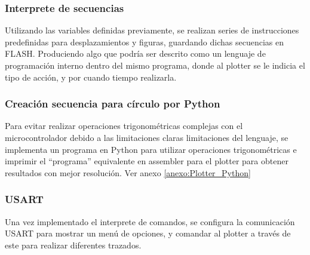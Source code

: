 \subsubsection{Interprete de secuencias}
Utilizando las variables definidas previamente, se realizan series de instrucciones predefinidas para desplazamientos y figuras, guardando dichas secuencias en FLASH. Produciendo algo que podría ser descrito como un lenguaje de programación interno dentro del mismo programa, donde al plotter se le indicia el tipo de acción, y por cuando tiempo realizarla. 

\subsubsection{Creación secuencia para círculo por Python}
Para evitar realizar operaciones trigonométricas complejas con el microcontrolador debido a las limitaciones claras limitaciones del lenguaje, se implementa un programa en Python para utilizar operaciones trigonométricas e imprimir el ``programa'' equivalente en assembler para el plotter para obtener resultados con mejor resolución. Ver anexo \ref{anexo:Plotter_Python}

\subsubsection{USART}
Una vez implementado el interprete de comandos, se configura la comunicación USART para mostrar un menú de opciones, y comandar al plotter a través de este para realizar diferentes trazados.


